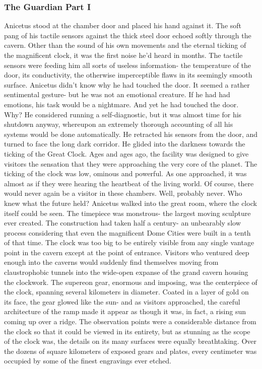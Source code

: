 \documentclass[a4paper]{article}
\begin{document}
\subsubsection{The Guardian Part I}
Anicetus stood at the chamber door and placed his hand against it. The soft pang of his tactile sensors against the thick steel door echoed softly through the cavern. Other than the sound of his own movements and the eternal ticking of the magnificent clock, it was the first noise he’d heard in months.
The tactile sensors were feeding him all sorts of useless information- the temperature of the door, its conductivity, the otherwise imperceptible flaws in its seemingly smooth surface. Anicetus didn’t know why he had touched the door. It seemed a rather sentimental gesture- but he was not an emotional creature. If he had had emotions, his task would be a nightmare.
And yet he had touched the door. Why?
He considered running a self-diagnostic, but it was almost time for his shutdown anyway, whereupon an extremely thorough accounting of all his systems would be done automatically.
He retracted his sensors from the door, and turned to face the long dark corridor. He glided into the darkness towards the ticking of the Great Clock.
Ages and ages ago, the facility was designed to give visitors the sensation that they were approaching the very core of the planet. The ticking of the clock was low, ominous and powerful. As one approached, it was almost as if they were hearing the heartbeat of the living world.
Of course, there would never again be a visitor in these chambers. Well, probably never. Who knew what the future held?
Anicetus walked into the great room, where the clock itself could be seen. The timepiece was monstrous- the largest moving sculpture ever created. The construction had taken half a century- an unbearably slow process considering that even the magnificent Dome Cities were built in a tenth of that time.
The clock was too big to be entirely visible from any single vantage point in the cavern except at the point of entrance. Visitors who ventured deep enough into the caverns would suddenly find themselves moving from claustrophobic tunnels into the wide-open expanse of the grand cavern housing the clockwork. The supereon gear, enormous and imposing, was the centerpiece of the clock, spanning several kilometers in diameter. Coated in a layer of gold on its face, the gear glowed like the sun- and as visitors approached, the careful architecture of the ramp made it appear as though it was, in fact, a rising sun coming up over a ridge.
The observation points were a considerable distance from the clock so that it could be viewed in its entirety, but as stunning as the scope of the clock was, the details on its many surfaces were equally breathtaking. Over the dozens of square kilometers of exposed gears and plates, every centimeter was occupied by some of the finest engravings ever etched.
\end{document}
